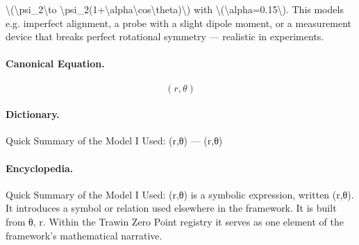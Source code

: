 \textbackslash{}(\textbackslash{}psi\_2\textbackslash{}to \textbackslash{}psi\_2(1+\textbackslash{}alpha\textbackslash{}cos\textbackslash{}theta)\textbackslash{}) with \textbackslash{}(\textbackslash{}alpha=0.15\textbackslash{}). This models e.g. imperfect alignment, a probe with a slight dipole moment, or a measurement device that breaks perfect rotational symmetry — realistic in experiments.

\paragraph{Canonical Equation.}
\[
(r,\theta)
\]

\paragraph{Dictionary.}
Quick Summary of the Model I Used: (r,θ) — (r,θ)

\paragraph{Encyclopedia.}
Quick Summary of the Model I Used: (r,θ) is a symbolic expression, written (r,θ). It introduces a symbol or relation used elsewhere in the framework. It is built from θ, r. Within the Trawin Zero Point registry it serves as one element of the framework's mathematical narrative.

